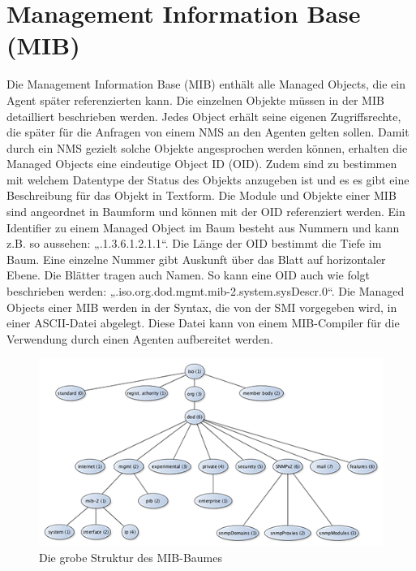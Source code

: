 \documentclass[11pt,a4paper]{article}
\begin{document}
\section*{Management Information Base (MIB)}
Die Management Information Base (MIB) enthält alle Managed Objects, die ein Agent später referenzierten kann. Die einzelnen Objekte müssen in der MIB detailliert beschrieben werden. Jedes Object erhält seine eigenen Zugriffsrechte, die später für die Anfragen von einem NMS an den Agenten gelten sollen. Damit durch ein NMS gezielt solche Objekte angesprochen werden können, erhalten die Managed Objects eine eindeutige Object ID (OID). Zudem sind zu bestimmen mit welchem Datentype der Status des Objekts anzugeben ist und es es gibt eine Beschreibung für das Objekt in Textform.
Die Module und Objekte einer MIB sind angeordnet in Baumform und können mit der OID referenziert werden. Ein Identifier zu einem Managed Object im Baum besteht aus Nummern und kann z.B. so aussehen: „.1.3.6.1.2.1.1“. Die Länge der OID bestimmt die Tiefe im Baum. Eine einzelne Nummer gibt Auskunft über das Blatt auf horizontaler Ebene. Die Blätter tragen auch Namen. So kann eine OID auch wie folgt beschrieben werden: „.iso.org.dod.mgmt.mib-2.system.sysDescr.0“.
Die Managed Objects einer MIB werden in der Syntax, die von der SMI vorgegeben wird, in einer ASCII-Datei abgelegt. Diese Datei kann von einem MIB-Compiler für die Verwendung durch einen Agenten aufbereitet werden.
\linebreak
\begin{figure}[h]
	\centering
	\includegraphics[scale=1]{Bilder/MIB.png}
	\caption{Die grobe Struktur des MIB-Baumes}
\end{figure}

\end{document}
